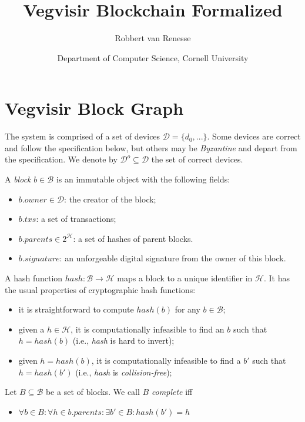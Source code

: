\documentclass{article}
\title{Vegvisir Blockchain Formalized}
\author{Robbert van Renesse}
\date{Department of Computer Science, Cornell University}
\begin{document}
\maketitle

\section*{Vegvisir Block Graph}

The system is comprised of a set of devices $\mathcal{D} = \{ d_0, ... \}$.
Some devices are correct and follow the specification below,
but others may be \emph{Byzantine} and depart from the specification.  We denote by
$\mathcal{D}^o \subseteq \mathcal{D}$ the set of correct devices.

A \emph{block} $b \in \mathcal{B}$ is an immutable object with the following fields:
\begin{itemize}
\item $b.\mathit{owner} \in \mathcal{D}$: the creator of the block;
\item $b.\mathit{txs}$: a set of transactions;
\item $b.\mathit{parents} \in 2^\mathcal{H}$: a set of hashes of parent blocks.
\item $b.\mathit{signature}$: an unforgeable digital signature from the owner of this block.
\end{itemize}

A hash function $\mathit{hash}: \mathcal{B} \rightarrow \mathcal{H}$ maps a block to a unique
identifier in $\mathcal{H}$.  It has the usual properties of cryptographic hash functions:
\begin{itemize}
\item it is straightforward to compute $\mathit{hash}(b)$ for any $b \in \mathcal{B}$;
\item given a $h \in \mathcal{H}$, it is computationally infeasible to find an $b$ such that $h = \mathit{hash}(b)$ (i.e., \textit{hash} is hard to invert);
\item given $h = \mathit{hash}(b)$, it is computationally infeasible to find a $b'$ such that $h = \mathit{hash}(b')$ (i.e., \textit{hash} is \emph{collision-free});
\end{itemize}

Let $B \subseteq \mathcal{B}$ be a set of blocks.  We call $B$ \emph{complete} iff
\begin{itemize}
\item $\forall b \in B: \forall h \in b.\mathit{parents}: \exists b' \in B: \mathit{hash}(b') = h$
\end{itemize}
\end{document}
